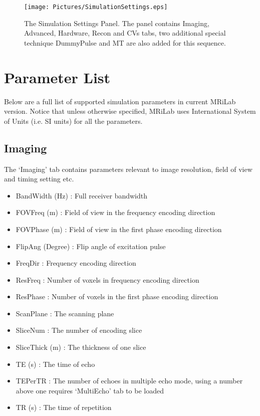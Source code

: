 \documentclass{book}%
\begin{document}
\begin{figure}[htbp]
	\centering
		\texttt{[image: Pictures/SimulationSettings.eps]}
	\caption{The Simulation Settings Panel. The panel contains Imaging, Advanced, Hardware, Recon and CVs tabs, two additional special technique DummyPulse and MT are also added for this sequence.}
	\label{fig:SimulationSettings}
\end{figure}

\section{Parameter List}

Below are a full list of supported simulation parameters in current MRiLab version. Notice that unless otherwise specified, MRiLab uses International System of Units (i.e. SI units) for all the parameters.

\subsection{Imaging}
The `Imaging' tab contains parameters relevant to image resolution, field of view and timing setting etc.
	\begin{itemize}
		\item BandWidth (Hz) : Full receiver bandwidth
		\item FOVFreq (m) : Field of view in the frequency encoding direction
		\item FOVPhase (m) : Field of view in the first phase encoding direction
	  \item FlipAng (Degree) : Flip angle of excitation pulse
		\item FreqDir : Frequency encoding direction
		\item ResFreq : Number of voxels in frequency encoding direction
		\item ResPhase : Number of voxels in the first phase encoding direction
		\item ScanPlane : The scanning plane
		\item SliceNum : The number of encoding slice
		\item SliceThick (m) : The thickness of one slice
		\item TE (s) : The time of echo
		\item TEPerTR : The number of echoes in multiple echo mode, using a number above one requires `MultiEcho' tab to be loaded
		\item TR (s) : The time of repetition
	\end{itemize}
\end{document}
